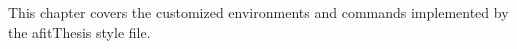 This chapter covers the customized environments and commands
implemented by the afitThesis style file.


